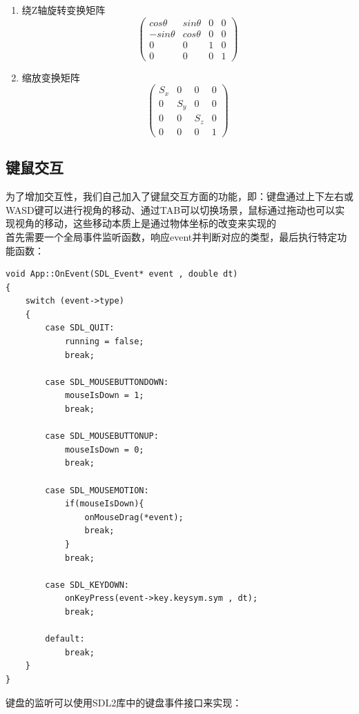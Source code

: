 \begin{spacing}{2.5}
\begin{enumerate}
		\item 绕Z轴旋转变换矩阵
		\begin{equation}
		\begin{pmatrix}
			cos\theta &  sin\theta &  0 &0 \\ 
 			-sin\theta &  cos\theta &  0& 0\\ 
 			0 & 0 & 1 &0 \\ 
 			0&  0&  0& 1
		\end{pmatrix}
		\label{zrotate}
		\end{equation}
		\item 缩放变换矩阵
		\begin{equation}
		\begin{pmatrix}
			S_{x}& 0 &  0 &0 \\ 
 			0 &  S_{y} &  0& 0\\ 
 			0 & 0 & S_{z} &0 \\ 
 			0&  0&  0& 1
		\end{pmatrix}
		\label{zrotate}
		\end{equation}
	\end{enumerate}
	\end{spacing}

	\subsection{键鼠交互}
\begin{spacing}{2.5}
		为了增加交互性，我们自己加入了键鼠交互方面的功能，即：键盘通过上下左右或WASD键可以进行视角的移动、通过TAB可以切换场景，鼠标通过拖动也可以实现视角的移动，这些移动本质上是通过物体坐标的改变来实现的\\
	首先需要一个全局事件监听函数，响应event并判断对应的类型，最后执行特定功能函数：
\end{spacing}

	\begin{lstlisting}
void App::OnEvent(SDL_Event* event , double dt)
{
	switch (event->type)
	{
		case SDL_QUIT:
			running = false;
			break;

        case SDL_MOUSEBUTTONDOWN:
            mouseIsDown = 1;
            break;

        case SDL_MOUSEBUTTONUP:
            mouseIsDown = 0;
            break;
        
        case SDL_MOUSEMOTION:
            if(mouseIsDown){
                onMouseDrag(*event);
                break;
            }
            break;

		case SDL_KEYDOWN:
            onKeyPress(event->key.keysym.sym , dt);
            break;
        
		default:
			break;
	}
}
	\end{lstlisting}
	\begin{spacing}{2.5}
			键盘的监听可以使用SDL2库中的键盘事件接口来实现：
	\end{spacing}

